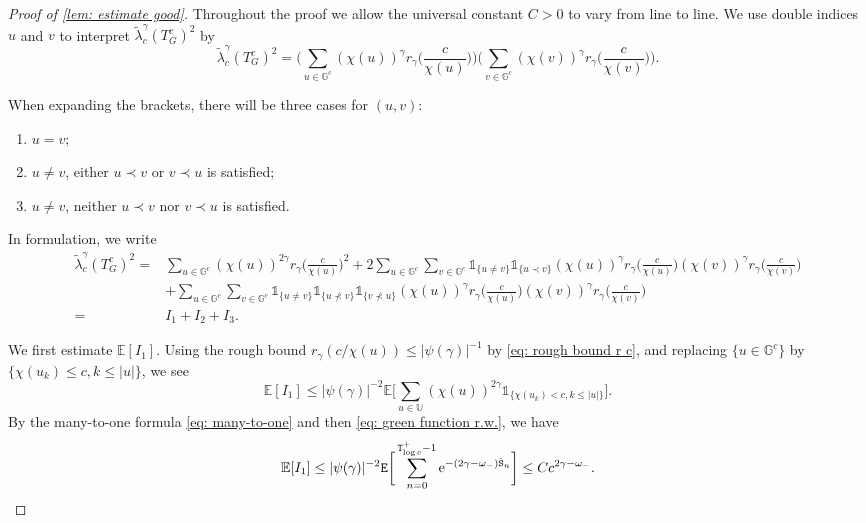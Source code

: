 \documentclass[10pt,a4paper]{amsart}
\begin{document}
\begin{proof}[Proof of \cref{lem: estimate good}]
Throughout the proof we allow the universal constant $C>0$ to vary from line to line. We use double indices $u$ and $v$ to interpret $\tilde{\lambda}^{\gamma}_c(T^c_G)^2$ by
\[\tilde{\lambda}^{\gamma}_c(T^c_G)^2 = \bigg(\sum_{u\in\mathbb{G}^c}(\chi(u))^{\gamma}r_{\gamma}\Big(\frac{c}{\chi(u)}\Big)\bigg)\bigg(\sum_{v\in\mathbb{G}^c}(\chi(v))^{\gamma}r_{\gamma}\Big(\frac{c}{\chi(v)}\Big)\bigg). \]

\noindent When expanding the brackets, there will be three cases for $(u, v)$:
\begin{enumerate}
   \item $u = v$;
   \item $u\ne v$, either $u\prec v$ or $v\prec u$ is satisfied;
   \item $u\ne v$, neither $u\prec v$ nor $v\prec u$ is satisfied.
\end{enumerate}
\noindent In formulation, we write
\begin{align*}
\tilde{\lambda}^{\gamma}_c(T^c_G)^2 =& \sum_{u\in\mathbb{G}^c}(\chi(u))^{2\gamma}r_{\gamma}\Big(\frac{c}{\chi(u)}\Big)^2 + 2\sum_{u\in\mathbb{G}^c} \sum_{v\in\mathbb{G}^c} \mathds{1}_{\{u\ne v\}}\mathds{1}_{\{u\prec v\}}(\chi(u))^{\gamma}r_{\gamma}\Big(\frac{c}{\chi(u)}\Big)(\chi(v))^{\gamma}r_{\gamma}\Big(\frac{c}{\chi(v)}\Big)\\
& + \sum_{u\in\mathbb{G}^c} \sum_{v\in\mathbb{G}^c} \mathds{1}_{\{u\ne v\}}\mathds{1}_{\{u\nprec v\}}\mathds{1}_{\{v\nprec u\}} (\chi(u))^{\gamma}r_{\gamma}\Big(\frac{c}{\chi(u)}\Big)(\chi(v))^{\gamma}r_{\gamma}\Big(\frac{c}{\chi(v)}\Big)\\
=& I_1 + I_2 + I_3.
\end{align*}

We first estimate $\mathbb{E}[I_1]$. Using the rough bound $r_{\gamma}(c/\chi(u))\le |\psi(\gamma)|^{-1}$ by \eqref{eq: rough bound r c}, and replacing $\{u\in\mathbb{G}^c\}$ by $\{\chi(u_k)\leq c, k\leq |u|\}$, we see
\[
\mathbb{E}[I_1] \leq |\psi(\gamma)|^{-2}\mathbb{E}\bigg[\sum_{u\in\mathbb{U}}(\chi(u))^{2\gamma}\mathds{1}_{\{\chi(u_k)<c, k\leq |u|\}}\bigg].
\]
By the many-to-one formula \eqref{eq: many-to-one} and then \eqref{eq: green function r.w.}, we have
\begin{equation}\label{eq: proof good I1 final}
\mathbb{E}[I_1] \leq |\psi(\gamma)|^{-2}{\tt E}\bigg[\sum^{{\tt T}_{\log c}^+-1}_{n=0} \mathrm{e}^{-(2\gamma-\omega_-){\hat{\tt S}}_n}\bigg]\leq Cc^{2\gamma-\omega_-}.
\end{equation}


\end{proof}
\end{document}
